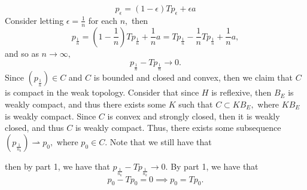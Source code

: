 \documentclass[11pt]{article}
\begin{document}
\begin{enumerate}
\begin{solution}
    \[p_\epsilon = (1-\epsilon)Tp_\epsilon + \epsilon a\] Consider letting $\epsilon = \frac{1}{n}$ for each $n,$ then \[p_\frac{1}{n}  = (1-\frac{1}{n})Tp_\frac{1}{n} + \frac{1}{n} a = Tp_{\frac{1}{n} } - \frac{1}{n}Tp_\frac{1}{n} + \frac{1}{n}a,\] and so as $n\to \infty,$
    \[p_\frac{1}{n} - Tp_\frac{1}{n} \to 0.\] Since $(p_\frac{1}{n}) \in C$ and $C$ is bounded and closed and convex, then we claim that $C$ is compact in the weak topology. Consider that since $H$ is reflexive, then $B_E$ is weakly compact, and thus there exists some $K$ such that $C \subset KB_E,$ where $KB_E$ is weakly compact. Since $C$ is convex and strongly closed, then it is weakly closed, and thus $C$ is weakly compact. Thus, there exists some subsequence $(p_\frac{1}{n_k}) \rightharpoonup p_0,$ where $p_0 \in C.$ Note that we still have that 
    
    then by part 1, we have that $p_\frac{1}{n_k} - Tp_\frac{1}{n_k} \to 0.$ By part 1, we have that
    \[p_0 - Tp_0  = 0 \implies p_0 = Tp_0.\]
\end{solution}
\end{enumerate}

\newpage
\end{document}
